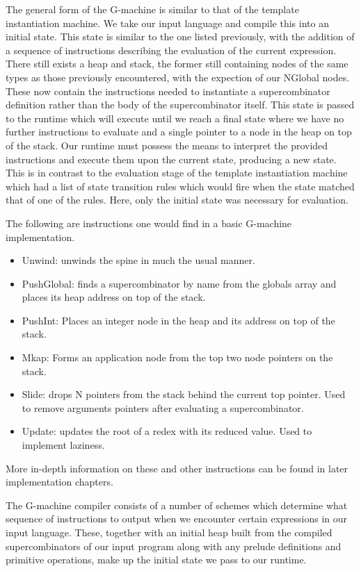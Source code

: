 The general form of the G-machine is similar to that of
the template instantiation machine. We take our input language
and compile this into an initial state. This state is similar
to the one listed previously, with the addition of a sequence
of instructions describing the evaluation of the current expression.
There still exists a heap and stack, the former still containing
nodes of the same types as those previously encountered, with
the expection of our NGlobal nodes. These now contain the 
instructions needed to instantiate a supercombinator definition
rather than the body of the supercombinator itself.
This state is passed to the runtime which will execute until
we reach a final state where we have no further instructions
to evaluate and a single pointer to a node in the heap on top
of the stack. Our runtime must possess the means to interpret 
the provided instructions and execute them upon the current
state, producing a new state. This is in contrast to the 
evaluation stage of the template instantiation machine which
had a list of state transition rules which would fire when
the state matched that of one of the rules. Here, only the
initial state was necessary for evaluation.

The following are instructions one would find in a
basic G-machine implementation. 

\begin{itemize}
	\item Unwind: unwinds the spine in much the usual
		  manner.
	\item PushGlobal: finds a supercombinator by name 
		  from the globals array and places its heap
		  address on top of the stack.
	\item PushInt: Places an integer node in the heap
		  and its address on top of the stack.
	\item Mkap: Forms an application node from the
		  top two node pointers on the stack.
	\item Slide: drops N pointers from the stack behind
		  the current top pointer. Used to remove
		  arguments pointers after evaluating a 
		  supercombinator.
	\item Update: updates the root of a redex with its
		  reduced value. Used to implement laziness.
\end{itemize}

\noindent More in-depth information on these and other 
instructions can be found in later implementation chapters. 

The G-machine compiler consists of a number of schemes which
determine what sequence of instructions to output when we
encounter certain expressions in our input language. These,
together with an initial heap built from the compiled 
supercombinators of our input program along with any prelude 
definitions and primitive operations, make up the initial
state we pass to our runtime.

